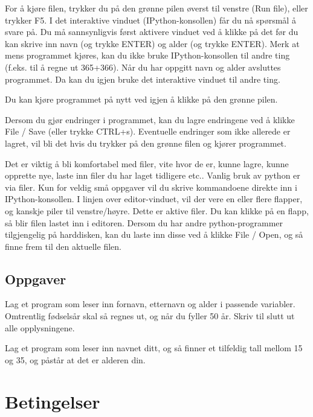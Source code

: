 {For å kjøre filen, trykker du på den grønne pilen øverst til venstre (Run file), eller trykker F5. I det interaktive vinduet (IPython-konsollen) får du nå spørsmål å svare på. Du må sannsynligvis først aktivere vinduet ved å klikke på det før du kan skrive inn navn (og trykke ENTER) og alder (og trykke ENTER). Merk at mens programmet kjøres, kan du ikke bruke IPython-konsollen til andre ting (f.eks. til å regne ut 365+366). Når du har oppgitt navn og alder avsluttes programmet. Da kan du igjen bruke det interaktive vinduet til andre ting. 

Du kan kjøre programmet på nytt ved igjen å klikke på den grønne pilen.

Dersom du gjør endringer i programmet, kan du lagre endringene ved å klikke File / Save (eller trykke CTRL+s). Eventuelle endringer som ikke allerede er lagret, vil bli det hvis du trykker på den grønne filen og kjører programmet.

Det er viktig å bli komfortabel med filer, vite hvor de er, kunne lagre, kunne opprette nye, laste inn filer du har laget tidligere etc.. Vanlig bruk av python er via filer. Kun for veldig små oppgaver vil du skrive kommandoene direkte inn i IPython-konsollen. I linjen over editor-vinduet, vil der vere en eller flere flapper, og kanskje piler til venstre/høyre. Dette er aktive filer. Du kan klikke på en flapp, så blir filen lastet inn i editoren. Dersom du har andre python-programmer tilgjengelig på harddisken,
kan du laste inn disse ved å klikke File / Open, og så finne frem til den aktuelle filen. 

\subsection{Oppgaver}

\begin{question}
Lag et program som leser inn fornavn, etternavn og alder i passende variabler. Omtrentlig fødselsår skal så regnes ut, og når du fyller 50 år. Skriv til slutt ut alle opplysningene.
\end{question}

\begin{question}
Lag et program som leser inn navnet ditt, og så finner et tilfeldig tall
mellom 15 og 35, og påstår at det er alderen din.
\end{question}

\section{Betingelser}

}
